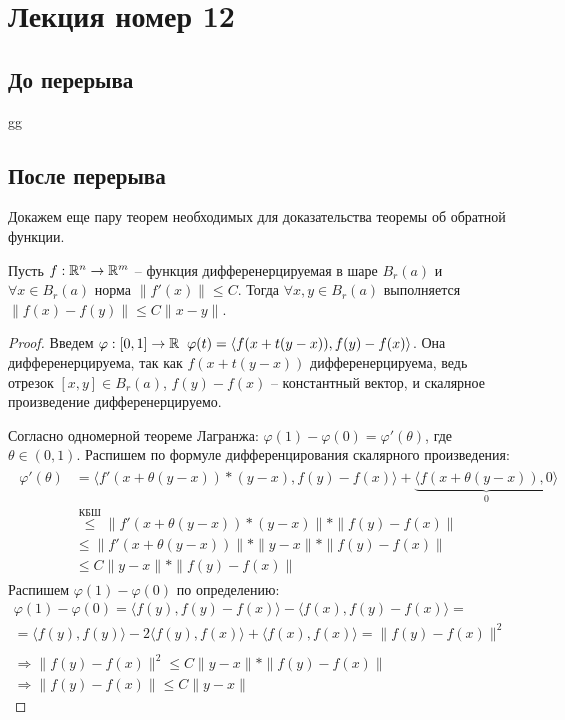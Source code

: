 \section{Лекция номер 12}
\subsection{До перерыва}
gg
\subsection{После перерыва}
Докажем еще пару теорем необходимых для доказательства теоремы об обратной функции.
\begin{theorem}
    Пусть $f: \mathbb{R}^n \to \mathbb{R}^m$ -- функция дифференерцируемая в шаре $B_r(a)$ и $\forall x \in B_r(a)$ норма $\| f'(x) \| \leqslant C$. 
    Тогда $\forall x, y \in B_r(a)$ выполняется $\| f(x) - f(y) \| \leqslant C \| x - y \|$.
\end{theorem}
\begin{proof}
    Введем $\varphi:[0, 1] \to \mathbb{R} \;\; \varphi(t) = \langle f(x + t(y - x)), f(y) - f(x) \rangle$.
    Она дифференерцируема, так как $f(x + t(y - x))$ дифференерцируема, ведь отрезок $[x, y] \in B_r(a)$, $f(y) - f(x)$ -- константный вектор, и скалярное произведение дифференерцируемо.

    \quad Согласно одномерной теореме Лагранжа: $\varphi(1) - \varphi(0) = \varphi'(\theta)$, где $\theta \in (0, 1)$. 
    Распишем по формуле дифференцирования скалярного произведения: \begin{gather*}
        \begin{split}
            \varphi'(\theta) &= \langle f'(x + \theta(y - x))*(y - x), f(y) - f(x) \rangle + \underbrace{\langle f(x + \theta(y - x)), 0 \rangle}_0  \\
            &\overset{\text{КБШ}}{\leqslant} \| f'(x + \theta(y - x))*(y - x) \| * \| f(y) - f(x) \| \\
            &\leqslant \| f'(x + \theta(y - x))\| * \| y - x \| * \| f(y) - f(x) \| \\
            &\leqslant C\| y - x \| * \| f(y) - f(x) \|
        \end{split}
    \end{gather*}
    \quad Распишем $\varphi(1) - \varphi(0)$ по определению: \begin{gather*}
        \varphi(1) - \varphi(0) = \langle f(y), f(y) - f(x) \rangle - \langle f(x), f(y) - f(x) \rangle = \\
        = \langle f(y), f(y) \rangle - 2 \langle f(y), f(x) \rangle +  \langle f(x), f(x) \rangle = \| f(y) - f(x) \|^2 \\ \\
        \Rightarrow \| f(y) - f(x) \|^2 \leqslant C \| y - x \| * \| f(y) - f(x) \| \\
        \Rightarrow \| f(y) - f(x) \| \leqslant C \| y - x \|
    \end{gather*} 
\end{proof}

